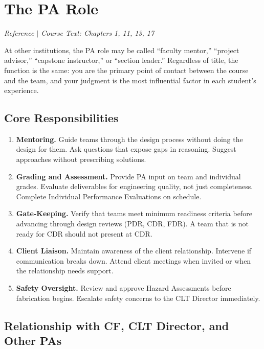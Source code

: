 \section{The PA Role}
\textit{Reference $|$ Course Text: Chapters 1, 11, 13, 17}

At other institutions, the PA role may be called ``faculty mentor,'' ``project advisor,'' ``capstone instructor,'' or ``section leader.'' Regardless of title, the function is the same: you are the primary point of contact between the course and the team, and your judgment is the most influential factor in each student's experience.

\subsection{Core Responsibilities}

\begin{enumerate}[nosep,leftmargin=1.5em]
\item \textbf{Mentoring.} Guide teams through the design process without doing the design for them. Ask questions that expose gaps in reasoning. Suggest approaches without prescribing solutions.

\item \textbf{Grading and Assessment.} Provide PA input on team and individual grades. Evaluate deliverables for engineering quality, not just completeness. Complete Individual Performance Evaluations on schedule.

\item \textbf{Gate-Keeping.} Verify that teams meet minimum readiness criteria before advancing through design reviews (PDR, CDR, FDR). A team that is not ready for CDR should not present at CDR.

\item \textbf{Client Liaison.} Maintain awareness of the client relationship. Intervene if communication breaks down. Attend client meetings when invited or when the relationship needs support.

\item \textbf{Safety Oversight.} Review and approve Hazard Assessments before fabrication begins. Escalate safety concerns to the CLT Director immediately.
\end{enumerate}

\subsection{Relationship with CF, CLT Director, and Other PAs}

